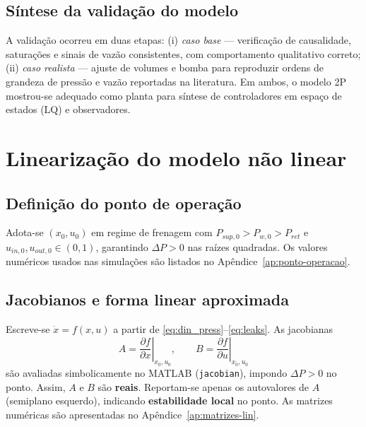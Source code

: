 \subsection{Síntese da validação do modelo}
\label{sec:controle-sintese-validacao}

A validação ocorreu em duas etapas: (i) \emph{caso base} — verificação de causalidade, saturações e sinais de vazão consistentes, com comportamento qualitativo correto; (ii) \emph{caso realista} — ajuste de volumes e bomba para reproduzir ordens de grandeza de pressão e vazão reportadas na literatura. Em ambos, o modelo 2P mostrou-se adequado como planta para síntese de controladores em espaço de estados (LQ) e observadores.

\section{Linearização do modelo não linear}
\label{sec:controle-linearizacao-2p}

\subsection{Definição do ponto de operação}
\label{sec:definicao-ponto-operacao}

Adota-se $(x_0,u_0)$ em regime de frenagem com $P_{sup,0}>P_{w,0}>P_{ret}$ e $u_{in,0},u_{out,0}\in(0,1)$, garantindo $\Delta P>0$ nas raízes quadradas. Os valores numéricos usados nas simulações são listados no Apêndice~\ref{ap:ponto-operacao}.

\subsection{Jacobianos e forma linear aproximada}
\label{sec:derivacao-matrizes-jacobianas}

Escreve-se $\dot{x}=f(x,u)$ a partir de \eqref{eq:din_press}–\eqref{eq:leaks}. As jacobianas
\[
    A=\left.\frac{\partial f}{\partial x}\right|_{x_0,u_0},
    \qquad
    B=\left.\frac{\partial f}{\partial u}\right|_{x_0,u_0}
\]
são avaliadas simbolicamente no MATLAB (\texttt{jacobian}), impondo $\Delta P>0$ no ponto. Assim, $A$ e $B$ são \textbf{reais}. Reportam-se apenas os autovalores de $A$ (semiplano esquerdo), indicando \textbf{estabilidade local} no ponto. As matrizes numéricas são apresentadas no Apêndice~\ref{ap:matrizes-lin}.

